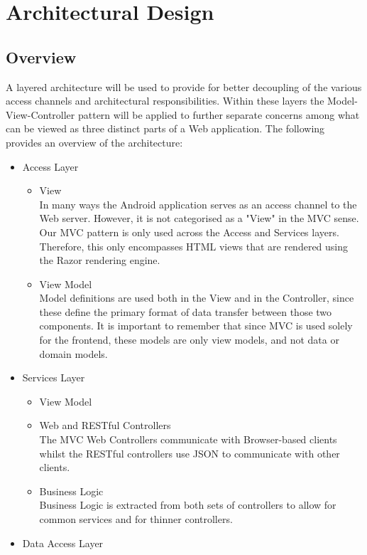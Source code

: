 \documentclass[11pt,a4paper,titlepage]{article}
\begin{document}
\section{Architectural Design}
	\subsection{Overview}
		A layered architecture will be used to provide for better decoupling of the various		access channels and architectural responsibilities. Within these layers the Model-View-Controller pattern will be applied to further separate concerns among what can be viewed as three distinct parts of a Web application. The following provides an overview of the architecture:
			\begin{itemize}
				\item Access Layer
					\begin{itemize}
						\item View\\
						In many ways the Android application serves as an access channel to the Web server. However, it is not categorised as a "View" in the MVC sense. Our MVC pattern is only used across the Access and Services layers. Therefore, this only encompasses HTML views that are rendered using the Razor rendering engine.
						\item View Model\\
						Model definitions are used both in the View and in the Controller, since these define the primary format of data transfer between those two components. It is important to remember that since MVC is used solely for the frontend, these models are only view models, and not data or domain models.
					\end{itemize}
				\item Services Layer
				    \begin{itemize}
						\item View Model
						\item Web and RESTful Controllers\\
						The MVC Web Controllers communicate with Browser-based clients whilst the RESTful controllers use JSON to communicate with other clients.
						\item Business Logic\\
						Business Logic is extracted from both sets of controllers to allow for common services and for thinner controllers.
					\end{itemize}
				\item Data Access Layer

\end{itemize}
\end{document}
